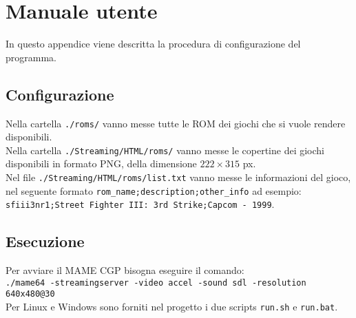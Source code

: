 \chapter{Manuale utente}
In questo appendice viene descritta la procedura di configurazione del programma.

\section{Configurazione}
Nella cartella \verb|./roms/| vanno messe tutte le ROM dei giochi che si vuole rendere disponibili.\\
Nella cartella \verb|./Streaming/HTML/roms/| vanno messe le copertine dei giochi disponibili in formato PNG, della dimensione $222 \times 315$ px.\\
Nel file \verb|./Streaming/HTML/roms/list.txt| vanno messe le informazioni del gioco, nel seguente formato \verb|rom_name;description;other_info| ad esempio:\\ \verb|sfiii3nr1;Street Fighter III: 3rd Strike;Capcom - 1999|.

\section{Esecuzione} \label{sec:chapMU_Esecuzione}
Per avviare il MAME CGP bisogna eseguire il comando:\\
\verb|./mame64 -streamingserver -video accel -sound sdl -resolution 640x480@30|\\
Per Linux e Windows sono forniti nel progetto i due scripts \verb|run.sh| e \verb|run.bat|.